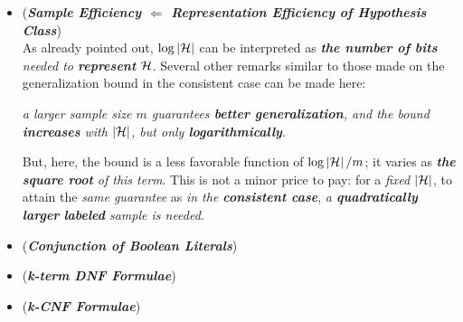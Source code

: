 \documentclass[11pt]{article}
\begin{document}
\begin{itemize}
\item \begin{remark} (\emph{\textbf{Sample Efficiency $\Leftarrow$ Representation Efficiency of Hypothesis Class}})\\
As already pointed out, $\log\left\lvert {\mathcal H} \right\rvert$ can be interpreted as \emph{\textbf{the number of bits} needed to \textbf{represent} ${\mathcal H}$}. Several other remarks similar to those made on the generalization bound in the consistent case can be made here: 

\emph{a larger sample size $m$ guarantees \textbf{better generalization}, and the bound \textbf{increases} with $\left\lvert {\mathcal H} \right\rvert$, but only \textbf{logarithmically}}.

But, here, the bound is a less favorable function of $\log\left\lvert {\mathcal H} \right\rvert/m$; it varies as \emph{\textbf{the square root} of this term}. This is not a minor price to pay: for a \emph{fixed} $\left\lvert {\mathcal H} \right\rvert$, to attain the \emph{same guarantee} as \emph{in the \textbf{consistent case}}, \emph{a \textbf{quadratically larger} \textbf{labeled} sample is needed}.
\end{remark}

\item \begin{example}(\emph{\textbf{Conjunction of Boolean Literals}}) \citep{mohri2018foundations}\\
\end{example}

\item \begin{example}(\emph{\textbf{k-term DNF Formulae}})  \citep{mohri2018foundations}\\
\end{example}

\item \begin{example}(\emph{\textbf{k-CNF Formulae}})  \citep{mohri2018foundations}\\
\end{example}
\end{itemize}
\end{document}
